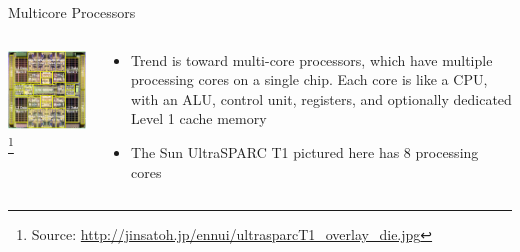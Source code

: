 \documentclass{beamer}
\begin{document}
\begin{frame}{Multicore Processors}

\begin{columns}[t]
\begin{column}{2.8in}
\begin{center}
\includegraphics[width=2.5in]{ultrasparc-die.jpg}\footnote{Source: \url{http://jinsatoh.jp/ennui/ultrasparcT1_overlay_die.jpg}}
\end{center}
\end{column}
\begin{column}{2.2in}
\begin{itemize}
\item Trend is toward multi-core processors, which have multiple
  processing cores on a single chip.  Each core is like a CPU, with an
  ALU, control unit, registers, and optionally dedicated Level 1 cache
  memory
\item The Sun UltraSPARC T1 pictured here has 8 processing cores
\end{itemize}
\end{column}
\end{columns}

\end{frame}
\end{document}
